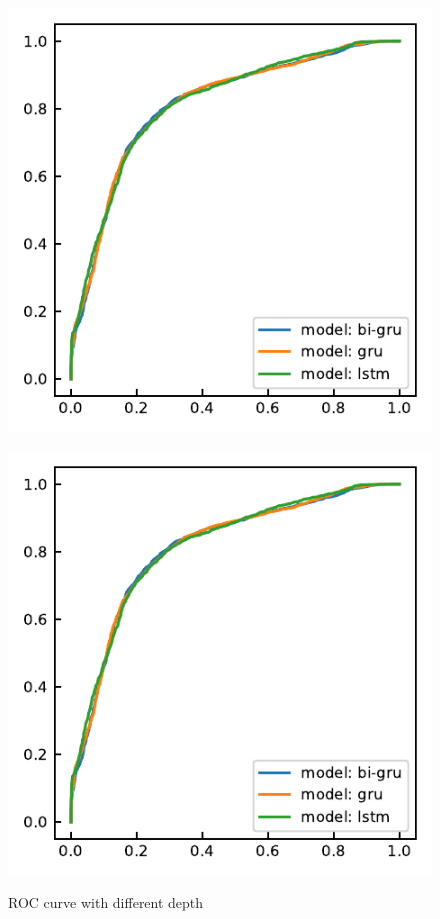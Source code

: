 \begin{figure}[H]
\begin{minipage}[b]{0.33\columnwidth}
		\includegraphics[clip, width=\linewidth]{fig/chapter4/3d/roc/depth_50.pdf}
		\label{fig:}
	\end{minipage}
	\begin{minipage}[b]{0.33\columnwidth}
		\centering
		\includegraphics[clip, width=\linewidth]{fig/chapter4/3d/roc/depth_100.pdf}
		\label{fig:}
	\end{minipage}
	
	\caption{ROC curve with different depth}
	\label{fig:2dcnn+LSTM_roc}
	
\end{figure}


